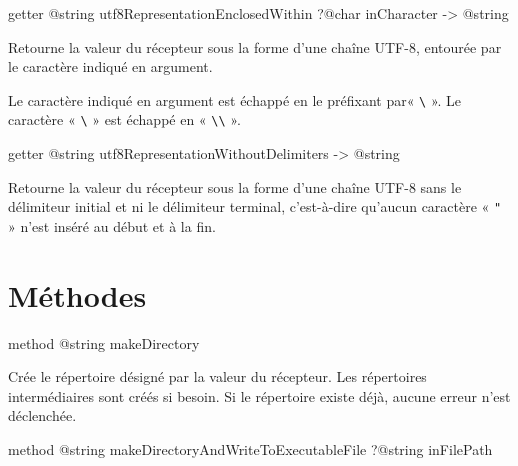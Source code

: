 \begin{galgas3box}
getter @string utf8RepresentationEnclosedWithin ?@char inCharacter -> @string
\end{galgas3box}

Retourne la valeur du récepteur sous la forme d'une chaîne UTF-8, entourée par le caractère indiqué en argument.

Le caractère indiqué en argument est échappé en le préfixant par« \texttt{\textbackslash} ». Le caractère « \texttt{\textbackslash} » est échappé en « \texttt{\textbackslash\textbackslash} ».










\begin{galgas3box}
getter @string utf8RepresentationWithoutDelimiters -> @string
\end{galgas3box}

Retourne la valeur du récepteur sous la forme d'une chaîne UTF-8 sans le délimiteur initial et ni le délimiteur terminal, c'est-à-dire qu'aucun caractère « \texttt{"} » n'est inséré au début et à la fin.














\section{Méthodes}






\begin{galgas3box}
method @string makeDirectory
\end{galgas3box}

Crée le répertoire désigné par la valeur du récepteur. Les répertoires intermédiaires sont créés si besoin. Si le répertoire existe déjà, aucune erreur n'est déclenchée.







\begin{galgas3box}
method @string makeDirectoryAndWriteToExecutableFile ?@string inFilePath
\end{galgas3box}

